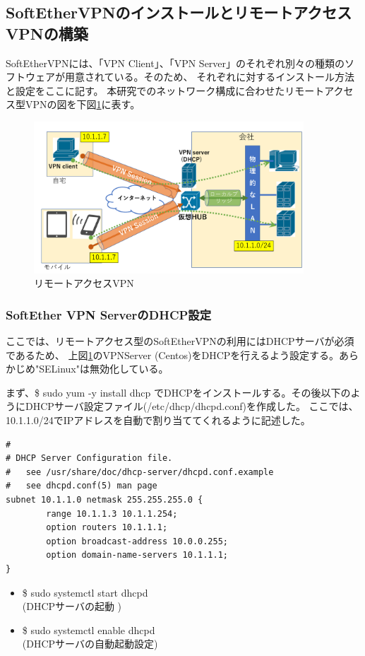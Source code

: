 \documentclass[11pt,a4j,titlepage]{jreport}
\begin{document}
\subsection*{SoftEtherVPNのインストールとリモートアクセスVPNの構築}
SoftEtherVPNには、「VPN Client」、「VPN Server」のそれぞれ別々の種類のソフトウェアが用意されている。そのため、
それぞれに対するインストール方法と設定をここに記す。
本研究でのネットワーク構成に合わせたリモートアクセス型VPNの図を下図\ref{softether}に表す。

\begin{figure}[H]
    \centering
    \includegraphics*[width=0.9\textwidth,page=2]{graphs/softetherVPN.pdf}
    \caption{リモートアクセスVPN}
    \label{softether}
\end{figure}
\subsubsection*{SoftEther VPN ServerのDHCP設定}
ここでは、リモートアクセス型のSoftEtherVPNの利用にはDHCPサーバが必須であるため、
上図\ref{softether}のVPNServer (Centos)をDHCPを行えるよう設定する。あらかじめ"SELinux"は無効化している。\par
まず、\$ sudo yum -y install dhcp でDHCPをインストールする。その後以下のようにDHCPサーバ設定ファイル(/etc/dhcp/dhcpd.conf)を作成した。
ここでは、10.1.1.0/24でIPアドレスを自動で割り当ててくれるように記述した。
\begin{lstlisting}
#
# DHCP Server Configuration file.
#   see /usr/share/doc/dhcp-server/dhcpd.conf.example
#   see dhcpd.conf(5) man page
subnet 10.1.1.0 netmask 255.255.255.0 {
        range 10.1.1.3 10.1.1.254;
        option routers 10.1.1.1;
        option broadcast-address 10.0.0.255;
        option domain-name-servers 10.1.1.1;
} 

\end{lstlisting}
\begin{itemize}
    \setlength{\parskip}{0.0cm} %
    \setlength{\itemsep}{0.0cm} 
    \item \$ sudo systemctl start dhcpd \\(DHCPサーバの起動 )
    \item \$ sudo systemctl enable dhcpd \\(DHCPサーバの自動起動設定)
\end{itemize}
\end{document}

